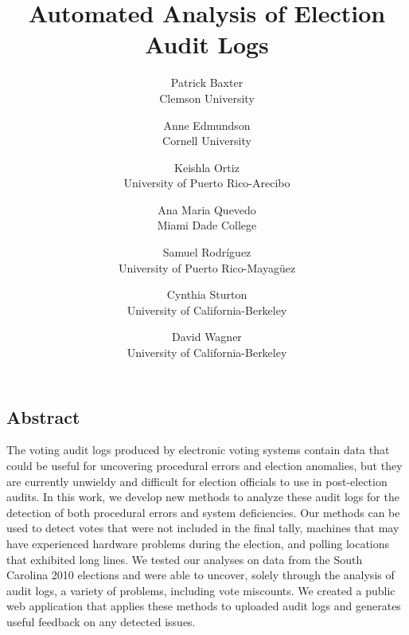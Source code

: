 \documentclass[letterpaper,twocolumn,10pt]{article}
\begin{document}
\date{}

\title{\Large \bf Automated Analysis of Election Audit Logs}

\author{
 {\rm Patrick Baxter}\\
 Clemson University
 \and
 {\rm Anne Edmundson}\\
 Cornell University
 \and
 {\rm Keishla Ortiz}\\
University of Puerto Rico-Arecibo
 \and
 {\rm Ana Maria Quevedo}\\
Miami Dade College
 \and
 {\rm Samuel Rodr\'{i}guez}\\
University of Puerto Rico-Mayag\"uez
 \and
 {\rm Cynthia Sturton}\\
University of California-Berkeley
 \and
 {\rm David Wagner}\\
University of California-Berkeley
} %

\maketitle



\subsection*{Abstract}
The voting audit logs produced by electronic voting systems contain data
that could be useful for uncovering procedural errors and election anomalies,
but they 
are currently unwieldy and difficult for election officials to use in
post-election audits. In this work, we develop new methods to analyze these
audit logs for the detection of both procedural errors and system
deficiencies. Our methods can be used to detect votes that were not included in
the final tally, machines that may have experienced hardware problems during the
election, and polling locations that exhibited long lines. We tested our analyses on
data from the South Carolina 2010 elections and were able to uncover, solely
through the analysis of audit logs, a variety of problems, including vote
miscounts. We created a public web application that applies these methods to
uploaded audit logs and generates useful feedback on any detected issues.

\setlength{\parskip}{1ex plus 2ex minus 2ex}
\end{document}
